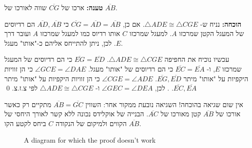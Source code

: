\textbf{טענה:}
ארכו של 
$\overline{CG}$
שווה לאורכו של
$\overline{AB}$.

\textbf{הוכחה:}
נניח ש-%
$\triangle ADE\cong \triangle CGE$.
אם כן, 
$\overline{CG}=\overline{AD}=\overline{AB}$
כי 
$\overline{AD},\overline{AB}$
הם רדיוסים של המעגל הקטן שמרכזו 
$A$.
למעגל שמרכזו
$C$
אותו רדיוס כמו למעגל שמרכזו 
$A$
ועובר דרך 
$E$.
לכן, ניתן להתייחס אליהם כ-"אותו" מעגל.

עכשיו נוכיח את החפיפה
$\triangle ADE\cong \triangle CGE$.
$\overline{EG}=\overline{ED}$
כי הם רדיוסים של המעגל שמרכזו
$E$,
ו-%
$\overline{EC}=\overline{EA}$
כי הם רדיוסים של "אותו" מעגל. 
$\angle GCE=\angle DAE$
כי הן זוויות היקפיות על "אותו" מיתר 
$\overline{EG},\overline{ED}$.
 $\angle CGE=\angle ADE$
כי הן זוויות היקפיות על "אותו" מיתר
$\overline{EC},\overline{EA}$.
. לכן,
$\angle GEC=\angle DEA$
ו-%
$\triangle ADE\cong \triangle CGE$
לפי צ.ז.צ.
\qed

אין שום שגיאה בהוכחה! השגיאה נובעת ממקור אחר: השווין
$\overline{AB}=\overline{GC}$
מתקיים רק כאשר אורכו של 
$\overline{AB}$
קטן מאורכו של
$\overline{AC}$.
הבנייה של אוקלידס נכונה ללא קשר לאורך היחסי של הקווים ולמיקום של הנקודה
$C$
ביחס לקטע הקו
$\overline{AB}$.

\begin{figure}[htb]
\begin{center}
\end{center}
\caption{A diagram for which the proof doesn't work}\label{f.collapse-incorrect-4}
\end{figure}



